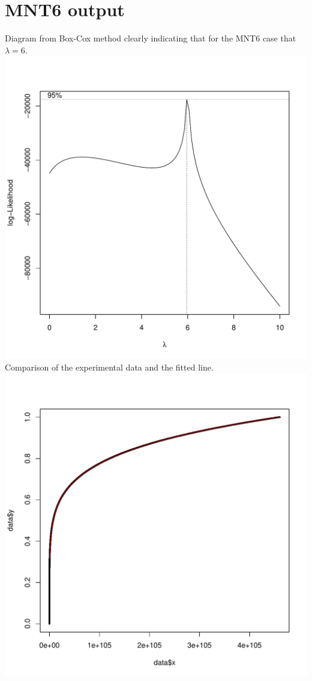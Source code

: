 \documentclass[a4paper, 12pt, envcountsect, runningheads]{llncs}
\numberwithin{figure}{section}
\numberwithin{equation}{section}
\begin{document}
\section{MNT6 output}\label{A:MNT6_output}
Diagram from Box-Cox method clearly indicating that for the MNT6 case that $\lambda=6$.\\
\includegraphics[scale=0.45]{graphs/CheckLineFit2}\label{fig:boxcox}\\
Comparison of the experimental data and the fitted line.\\
\includegraphics[scale=0.45]{graphs/CheckLineFit4}\label{fig:linefit}
\end{document}

